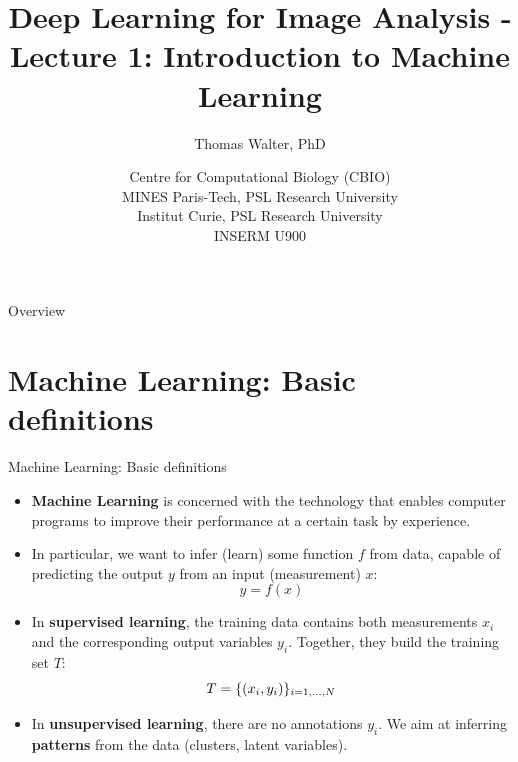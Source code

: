 \documentclass[xcolor=pdftex,dvipsnames,table]{beamer}
\title{Deep Learning for Image Analysis - \\
	   Lecture 1: Introduction to Machine Learning}
\author{Thomas Walter, PhD}
\date{Centre for Computational Biology (CBIO) \\
	  MINES Paris-Tech, PSL Research University \\
	  Institut Curie, PSL Research University \\
	  INSERM U900}
\begin{document}
\begin{frame}
\titlepage
\end{frame}

\begin{frame}{Overview}
\tableofcontents
\end{frame}

\section{Machine Learning: Basic definitions}

\begin{frame}{Machine Learning: Basic definitions}
\begin{itemize}
    \item \textbf{Machine Learning} is concerned with the technology that enables computer programs to improve their performance at a certain task by experience.
	\item In particular, we want to infer (learn) some function $f$ from data, capable of predicting the output $y$ from an input (measurement) $x$:
	\begin{equation*}
	y = f(x)
	\end{equation*}
      	\item In \textbf{supervised learning}, the training data contains both measurements $x_i$ and the corresponding output variables $y_i$. Together, they build the training set $T$:
	\begin{equation*}
	T = \{(x_i, y_i)\}_{i=1, \ldots, N}
	\end{equation*}
	\item In \textbf{unsupervised learning}, there are no annotations $y_i$. We aim at inferring \textbf{patterns} from the data (clusters, latent variables).    
\end{itemize}
\end{frame}
\end{document}
